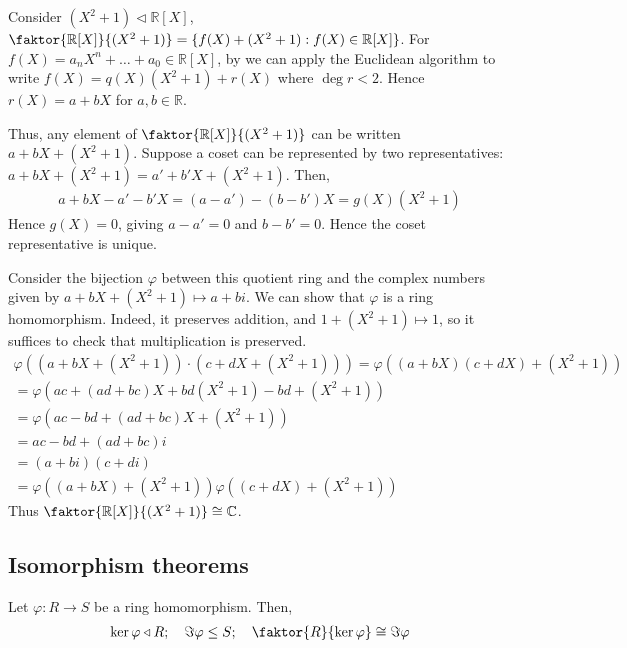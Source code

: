 \begin{example}
	Consider $(X^2 + 1) \triangleleft \mathbb R[X]$, $\faktor{\mathbb{R}[X]}{(X^2 + 1)} = \{f(X) + (X^2 + 1) : f(X) \in \mathbb{R}[X]\}$.
	For $f(X) = a_n X^n + \dots + a_0 \in \mathbb R[X]$, by  we can apply the Euclidean algorithm to write $f(X) = q(X) (X^2 + 1) + r(X)$ where $\deg r < 2$.
	Hence $r(X) = a+bX$ for $a, b \in \mathbb{R}$. 

	Thus, any element of $\faktor{\mathbb R[X]}{(X^2 + 1)}$ can be written $a+bX + (X^2 + 1)$.
	Suppose a coset can be represented by two representatives: $a+bX + (X^2+1) = a' + b'X + (X^2 + 1)$.
	Then,
	\begin{align*}
		a+bX - a' - b'X = (a-a') - (b-b')X = g(X) (X^2 + 1)
	\end{align*}
	Hence $g(X) = 0$, giving $a-a' = 0$ and $b-b' = 0$.
	Hence the coset representative is unique.

	Consider the bijection $\varphi$ between this quotient ring and the complex numbers given by $a+bX + (X^2 + 1) \mapsto a+bi$.
	We can show that $\varphi$ is a ring homomorphism.
	Indeed, it preserves addition, and $1 + (X^2 + 1) \mapsto 1$, so it suffices to check that multiplication is preserved.
	\begin{gather*}
		\varphi((a+bX + (X^2 + 1)) \cdot (c+dX + (X^2 + 1))) = \varphi((a+bX)(c+dX) + (X^2 + 1)) \\
		= \varphi(ac + (ad + bc)X + bd (X^2 + 1) - bd + (X^2 + 1)) \\
		= \varphi(ac-bd+(ad+bc)X + (X^2 + 1))\\
		= ac - bd + (ad + bc)i \\
		= (a+bi)(c+di) \\
		= \varphi((a+bX) + (X^2 + 1)) \varphi((c+dX) + (X^2 + 1))
	\end{gather*}
	Thus $\faktor{\mathbb R[X]}{(X^2 + 1)} \cong \mathbb C$.
\end{example}

\subsection{Isomorphism theorems}
\begin{theorem}
	Let $\varphi \colon R \to S$ be a ring homomorphism.
	Then,
	\begin{align*}
		\ker \varphi \triangleleft R;\quad \Im \varphi \leq S;\quad \faktor{R}{\ker \varphi} \cong \Im \varphi
	\end{align*}
\end{theorem}

